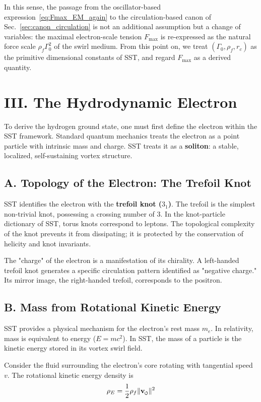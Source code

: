 \documentclass[11pt]{article}
\newcommand{\vswirl}{\mathbf{v}_{\mkern-2mu\scriptscriptstyle\boldsymbol{\circlearrowleft}}}
\begin{document}
In this sense, the passage from the oscillator-based expression~\eqref{eq:Fmax_EM_again} to the circulation-based canon of Sec.~\ref{sec:canon_circulation} is not an additional assumption but a change of variables: the maximal electron-scale tension \(F_{\max}\) is re-expressed as the natural force scale \(\rho_{\!f}\Gamma_0^2\) of the swirl medium. From this point on, we treat \((\Gamma_0,\rho_{\!f},r_c)\) as the primitive dimensional constants of SST, and regard \(F_{\max}\) as a derived quantity.

\section*{III. The Hydrodynamic Electron}
To derive the hydrogen ground state, one must first define the electron within the SST framework. Standard quantum mechanics treats the electron as a point particle with intrinsic mass and charge. SST treats it as a \textbf{soliton}: a stable, localized, self-sustaining vortex structure.

\subsection*{A. Topology of the Electron: The Trefoil Knot}
SST identifies the electron with the \textbf{trefoil knot ($3_1$)}. The trefoil is the simplest non-trivial knot, possessing a crossing number of 3. In the knot-particle dictionary of SST, torus knots correspond to leptons. The topological complexity of the knot prevents it from dissipating; it is protected by the conservation of helicity and knot invariants.

The "charge" of the electron is a manifestation of its chirality. A left-handed trefoil knot generates a specific circulation pattern identified as "negative charge." Its mirror image, the right-handed trefoil, corresponds to the positron.

\subsection*{B. Mass from Rotational Kinetic Energy}
SST provides a physical mechanism for the electron's rest mass $m_e$. In relativity, mass is equivalent to energy ($E=mc^2$). In SST, the mass of a particle is the kinetic energy stored in its vortex swirl field.

Consider the fluid surrounding the electron's core rotating with tangential speed $v$. The rotational kinetic energy density is
\begin{equation}
\rho_E = \frac{1}{2} \rho_f \|\vswirl\|^2
\end{equation}
\end{document}
